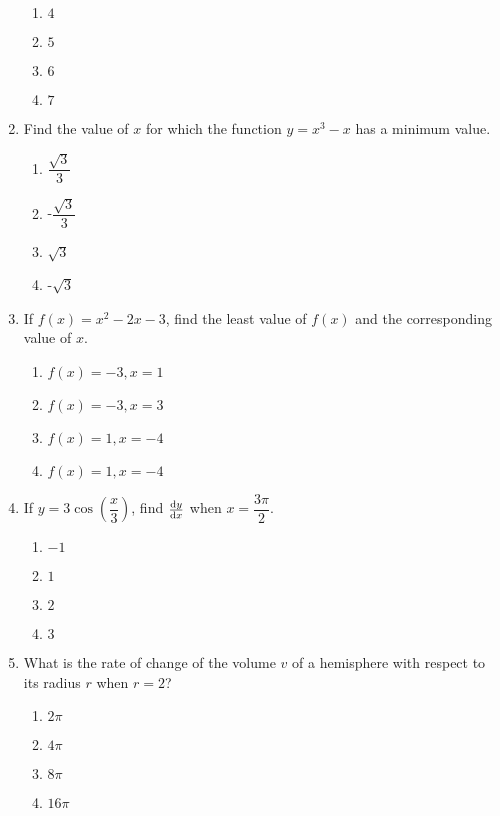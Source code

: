 \begin{multicols}{2}
\begin{enumerate}[label={\arabic*.}]
\begin{enumerate}[label={\Alph*.}]
            \item \(4\)
            \item \(5\)
            \item \(6\)
            \item \(7\)
        \end{enumerate}
  \item Find the value of \(x\) for which the function \(y = {x}^{3} - x\) has a minimum value.
        \begin{enumerate}[label={\Alph*.}]
            \item \(\dfrac{\sqrt{3}}{3}\)
            \item -\(\dfrac{\sqrt{3}}{3}\)
            \item \(\sqrt{3}\)
            \item -\(\sqrt{3}\)
        \end{enumerate}
  \item If \(f(x) = {x}^{2} - 2x - 3\), find the least value of \(f(x)\) and the corresponding value of \(x\).
        \begin{enumerate}[label={\Alph*.}]
            \item \(f(x) = -3, x = 1\)
            \item \(f(x) = -3, x = 3\)
            \item \(f(x) = 1, x = -4\)
            \item \(f(x) = 1, x = -4\)
        \end{enumerate}
  \item If \(y = 3 \cos\left(\dfrac{x}{3}\right)\), find \(\dv{y}{x}\) when \(x = \dfrac{3\pi}{2}\).
        \begin{enumerate}[label={\Alph*.}]
            \item \(-1\)
            \item \(1\)
            \item \(2\)
            \item  \(3\)
        \end{enumerate}
  \item What is the rate of change of the volume \(v\) of a hemisphere with respect to its radius \(r\) when \(r = 2\)?
        \begin{enumerate}[label={\Alph*.}]
            \item  \(2\pi\)
            \item  \(4\pi\)
            \item  \(8\pi\)
            \item  \(16\pi\)
        \end{enumerate}

\end{enumerate}
\end{multicols}
